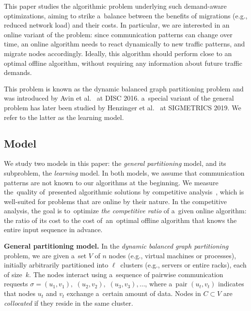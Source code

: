 \documentclass[a4paper,anonymous,USenglish]{lipics-v2019}
\begin{document}
This paper studies the algorithmic problem underlying such demand-aware
optimizations, aiming to strike a~balance between the benefits of migrations (e.g., reduced network load) and their costs.
In particular, we are interested in an online variant of the problem: since communication patterns can change over time, an online algorithm needs to react dynamically to new traffic patterns, and migrate nodes  accordingly.
Ideally, this algorithm should perform close to an optimal offline algorithm, without requiring any information about future traffic demands. 

\pagebreak

This problem is known as the dynamic balanced graph partitioning problem and was introduced by Avin et al.~\cite{repartition-disc, sidma-arxiv} at DISC 2016. a~special variant of the general problem has later been studied by Henzinger et al.~\cite{sigmetrics19_partitioning} at SIGMETRICS 2019.
We refer to the latter as the learning model.



\subsection{Model}

We study two models in this paper: the \emph{general partitioning} model, and its subproblem, the \emph{learning} model.
In both models, we assume that communication patterns are not known to our algorithms at the beginning.
We measure the~quality of~presented algorithmic solutions by competitive analysis~\cite{borodin-book}, which is well-suited for problems that are online by their nature.
In the competitive analysis, the goal is to~optimize \emph{the competitive ratio} of a~given online algorithm: the ratio of its cost to the cost of~an~optimal offline algorithm that knows the entire input sequence in advance.

\noindent
\textbf{General partitioning model.}
In the \emph{dynamic balanced graph partitioning} problem, we are given a~set $V$ of $n$ nodes 
(e.g., virtual machines or processes),
initially arbitrarily partitioned into $\ell$~clusters
(e.g., servers or entire racks),
each of size~$k$.
The nodes interact using
a~sequence of pairwise communication requests
$\sigma = (u_1,v_1),$ $(u_2,v_2),$ $(u_3,v_3), \ldots$,
where a~pair $(u_t,v_t)$ indicates that nodes $u_t$ and $v_t$ exchange a~certain amount of data.
Nodes in $C \subset V$ are \emph{collocated}
if they reside in the same cluster.
\end{document}
